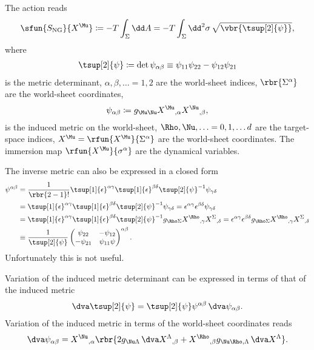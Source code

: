 \documentclass[a4paper,11pt]{article}
\begin{document}
The action reads \cite{Nambu1970a,Goto1971}
\begin{align}
\sfun{S_{\text{NG}}}{X^{\Mu}} \coloneqq -T \int_{\Sigma} \dd A = 
-T \int_{\Sigma} \dd^2 \sigma\,\sqrt{\vbr{\tsup[2]{\psi}}},
\end{align}
where
\begin{align}
\tsup[2]{\psi} \coloneqq \det \psi_{\alpha\beta} \equiv
\psi_{11}\psi_{22} - \psi_{12}\psi_{21}
\end{align}
is the metric determinant, $\alpha, \beta, \ldots = 1, 2$ are the world-sheet 
indices, $\rbr{\Sigma^\alpha}$ are the world-sheet coordinates, 
\begin{align}
\psi_{\alpha\beta} \coloneqq g_{\Mu\Nu} 
X^{\Mu}{}_{,\alpha} X^{\Nu}{}_{,\beta},
\end{align}
is the induced metric on the world-sheet, $\Rho, \Nu, \ldots = 0, 1, \ldots d$ 
are the target-space indices, $X^{\Mu} = \rfun{X^{\Mu}}{\Sigma^{\alpha}}$ are 
the world-sheet \cite{Susskind1970} coordinates. The immersion map 
$\rfun{X^{\Mu}}{\sigma^\alpha}$ are the dynamical variables.

The inverse metric can also be expressed in a closed form
\begin{align}
\psi^{\alpha\beta} &= \frac{1}{\rbr{2-1}!} 
	\tsup[1]{\epsilon}^{\alpha\gamma} \tsup[1]{\epsilon}^{\beta\delta} 
	\tsup[2]{\psi}^{-1} \psi_{\gamma\delta}
\nonumber \\
&=
	\tsup[1]{\epsilon}^{\alpha\gamma} \tsup[1]{\epsilon}^{\beta\delta} 
	\tsup[2]{\psi}^{-1} \psi_{\gamma\delta} =
	\epsilon^{\alpha\gamma} \epsilon^{\beta\delta} \psi_{\gamma\delta}
\\
&=
\tsup[1]{\epsilon}^{\alpha\gamma} \tsup[1]{\epsilon}^{\beta\delta} 
	\tsup[2]{\psi}^{-1} g_{\Rho\Sigma} 
	X^{\Rho}{}_{,\gamma} X^{\Sigma}{}_{,\delta} =
\epsilon^{\alpha\gamma} \epsilon^{\beta\delta} g_{\Rho\Sigma} 
	X^{\Rho}{}_{,\gamma} X^{\Sigma}{}_{,\delta}
\\
&\equiv \frac{1}{\tsup[2]{\psi}}
\begin{pmatrix}
\psi_{22} & -\psi_{12} \\ -\psi_{21} & \psi_{11}\psi
\end{pmatrix}^{\alpha\beta}.
\end{align}
Unfortunately this is not useful.

Variation of the induced metric determinant can be expressed in terms of that 
of the induced metric
\begin{align}
\dva \tsup[2]{\psi} = \tsup[2]{\psi} \psi^{\alpha\beta}\,\dva 
	\psi_{\alpha\beta}.
\end{align}
Variation of the induced metric in terms of the world-sheet coordinates reads 
\begin{align}
\dva \psi_{\alpha\beta} = X^{\Nu}{}_{,\alpha} \rbr{
	2 g_{\Nu\Lambda}\, \dva X^{\Lambda}{}_{,\beta} + 
	X^{\Rho}{}_{,\beta} g_{\Nu\Rho,\Lambda}\, \dva X^{\Lambda}}.
\end{align}
\end{document}
